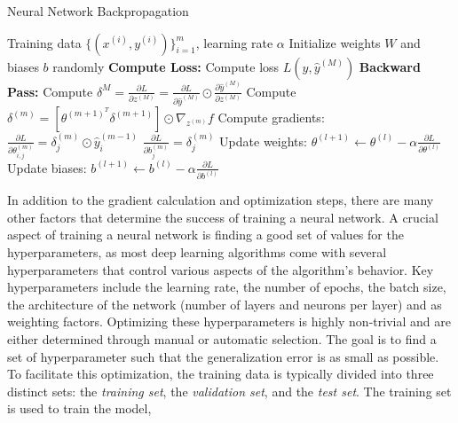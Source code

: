 \begin{algorithm}
    \caption{Neural Network Backpropagation \cite{rumelhart1986learning}}
    \label{alg:backprop}
    \begin{algorithmic}[1]
    \Require Training data $\{(x^{(i)}, y^{(i)})\}_{i=1}^{m}$, learning rate $\alpha$
    \State Initialize weights $W$ and biases $b$ randomly
    \Repeat
            \State \textbf{Compute Loss:}
            \State Compute loss $L(y, \hat{y}^{(M)})$
            \State \textbf{Backward Pass:}
            \State Compute $\delta^{M} = \frac{\partial L}{\partial z^{(M)}} = \frac{\partial L}{\partial \hat{y}^{(M)}} \odot \frac{\partial \hat{y}^{(M)}}{\partial z^{(M)}}$
                \State Compute $\delta^{(m)} = [\theta^{(m+1)^T}\delta^{(m+1)}] \odot \nabla_{z^{(m)}} f$
                \State Compute gradients:
                \State $\frac{\partial L}{\partial \theta_{i,j}^{(m)}} = \delta^{(m)}_j \odot \hat{y}_i^{(m-1)}$
                \State $\frac{\partial L}{\partial b_j^{(m)}} = \delta_j^{(m)}$
            \EndFor
        \EndFor
            \State Update weights: $\theta^{(l+1)} \leftarrow \theta^{(l)} - \alpha \frac{\partial L}{\partial \theta^{(l)}}$
            \State Update biases: $b^{(l+1)} \leftarrow b^{(l)} - \alpha \frac{\partial L}{\partial b^{(l)}}$
        \EndFor
    \end{algorithmic}
    \end{algorithm}
In addition to the gradient calculation and optimization steps, there are many other factors that determine the success of training a neural network.
A crucial aspect of training a neural network is finding a good set of values for the hyperparameters,
as most deep learning algorithms come with several hyperparameters that control various aspects of the algorithm's behavior.
Key hyperparameters include the learning rate,
the number of epochs, the batch size, the architecture of the network (number of layers and neurons per layer) and as weighting factors.
Optimizing these hyperparameters is highly non-trivial and are either determined through manual or automatic selection.
The goal is to find a set of hyperparameter such that the generalization error is as small as possible.
To facilitate this optimization, the training data is typically divided into three distinct sets: the \emph{training set},
the \emph{validation set}, and the \emph{test set}. The training set is used to train the model,
